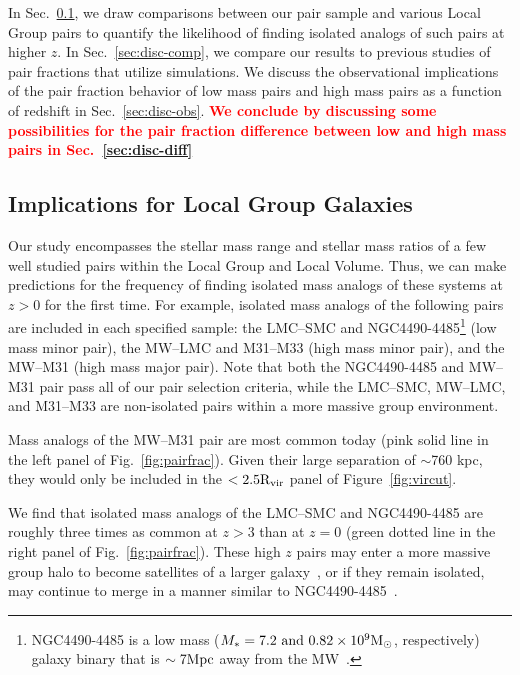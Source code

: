 \documentclass[linenumbers,twocolumn]{aastex631}
\newcommand{\add}[1]{\textcolor{red}{\textbf{#1}}}
\newcommand{\Rvir}{\ensuremath{\rm R_{vir}}}
\begin{document}
In Sec.~\ref{sec:disc-LG}, we draw comparisons between our pair sample and various Local Group pairs to quantify the likelihood of finding isolated analogs of such pairs at higher $z$.
In Sec.~\ref{sec:disc-comp}, we compare our results to previous studies of pair fractions that utilize simulations. 
We discuss the observational implications of the pair fraction behavior of low mass pairs and high mass pairs as a function of redshift
in Sec.~\ref{sec:disc-obs}.
\add{We conclude by discussing some possibilities for the pair fraction difference between low and high mass pairs in Sec.~\ref{sec:disc-diff}}

   \subsection{Implications for Local Group Galaxies}\label{sec:disc-LG}
    Our study encompasses the stellar mass range and stellar mass ratios of a few well studied pairs within the Local Group and Local Volume.
    Thus, we can make predictions for the frequency of finding isolated mass analogs of these systems at $z>0$ for the first time. 
    For example, isolated mass analogs of the following pairs are included in each specified sample:
    the LMC--SMC and NGC4490-4485\footnote{NGC4490-4485 is a low mass ($M_* = 7.2 \mbox{ and } 0.82 \times 10^9\mathrm{M}_\odot$, respectively) galaxy binary that is $\sim7\mathrm{Mpc}$ away from the MW~\citep{Theureau2007,Pearson2018}.} (low mass minor pair), the MW--LMC and M31--M33 (high mass minor pair), and the MW--M31 (high mass major pair).
    Note that both the NGC4490-4485 and MW--M31 pair pass all of our pair selection criteria, while the LMC--SMC,  MW--LMC, and M31--M33 are non-isolated pairs within a more massive group environment.

    Mass analogs of the MW--M31 pair are most common today (pink solid line in the left panel of Fig.~\ref{fig:pairfrac}). 
    Given their large separation of $\sim$760 kpc, they would only be included in the $<2.5\Rvir$ panel of Figure~\ref{fig:vircut}. 

    We find that isolated mass analogs of the LMC--SMC and NGC4490-4485 are roughly three times as common at $z>3$ than at $z=0$ (green dotted line in the right panel of Fig.~\ref{fig:pairfrac}). 
    These high $z$ pairs may enter a more massive group halo to become satellites of a larger galaxy~\citep[like the LMC--SMC, ][]{Besla2007,Patel2017a-Orbits}, or if they remain isolated, may continue to merge in a manner similar to NGC4490-4485~\citep{Pearson2018}. 
    
\end{document}
